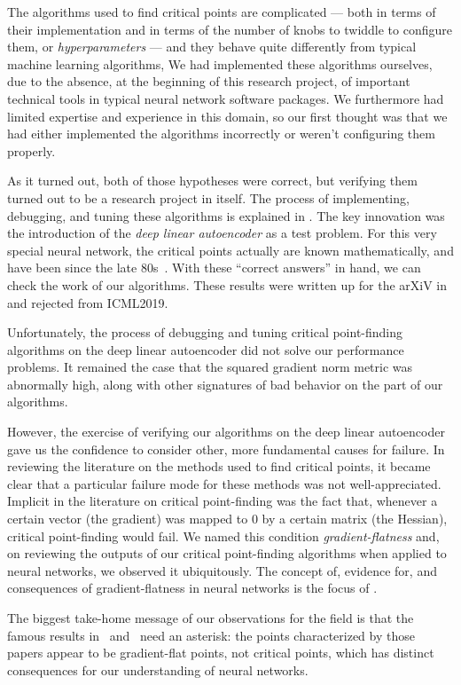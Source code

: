 \documentclass[../../thesis.tex]{subfiles}
\begin{document}
The algorithms used to find critical points are complicated ---
both in terms of their implementation and in terms of the number of knobs
to twiddle to configure them, or \emph{hyperparameters} ---
and they behave quite differently from typical machine learning algorithms,
We had implemented these algorithms ourselves,
due to the absence, at the beginning of this research project,
of important technical tools in typical neural network software packages.
We furthermore had limited expertise and experience in this domain,
so our first thought was that we had either implemented the algorithms incorrectly
or weren't configuring them properly.

As it turned out, both of those hypotheses were correct,
but verifying them turned out to be a research project in itself.
The process of implementing, debugging, and tuning these algorithms
is explained in .
The key innovation was the introduction of the \emph{deep linear autoencoder}
as a test problem.
For this very special neural network,
the critical points actually are known mathematically,
and have been since the late 80s~\cite{baldi1989}.
With these \enquote{correct answers} in hand,
we can check the work of our algorithms.
These results were written up for the arXiV
in~\cite{frye2019}
and rejected from ICML2019.

Unfortunately, the process of debugging and tuning critical point-finding
algorithms on the deep linear autoencoder did not solve
our performance problems.
It remained the case that the squared gradient norm metric was abnormally high,
along with other signatures of bad behavior on the part of our algorithms.

However, the exercise of verifying our algorithms on the deep linear autoencoder
gave us the confidence to consider other, more fundamental causes for failure.
In reviewing the literature on the methods used to find critical points,
it became clear that a particular failure mode for these methods
was not well-appreciated.
Implicit in the literature on critical point-finding was the fact that,
whenever a certain vector (the gradient)
was mapped to 0 by a certain matrix (the Hessian),
critical point-finding would fail.
We named this condition \emph{gradient-flatness}
and, on reviewing the outputs of our critical point-finding algorithms
when applied to neural networks,
we observed it ubiquitously.
The concept of, evidence for, and consequences of gradient-flatness
in neural networks is the focus of .

The biggest take-home message of our observations for the field
is that the famous results
in~\cite{dauphin2014} and~\cite{pennington2017}
need an asterisk:
the points characterized by those papers appear to be
gradient-flat points, not critical points,
which has distinct consequences for our understanding of neural networks.
\end{document}
